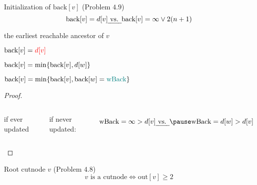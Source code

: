 \begin{frame}{}
  \begin{exampleblock}{Initialization of $\text{back}[v]$ (Problem $4.9$)}
    \[
      \text{back}[v] = d[v] \text{\emph{ vs. }} \text{back}[v] = \infty \lor 2(n+1) 
    \]
  \end{exampleblock}

  \pause
  \vspace{0.50cm}
  \centerline{ the earliest reachable ancestor of $v$} %

  \pause
  \vspace{0.30cm}
  \begin{description}
    \item[tree edge ($\to v$):]   $\text{back}[v] = \textcolor{red}{d[v]}$
    \item[back edge ($v \to w$):] $\text{back}[v] = \min \{\text{back}[v], d[w]\}$
    \item[backtracking from $w$:] $\text{back}[v] = \min \{\text{back}[v], \text{back}[w] = \textcolor{teal}{\text{wBack}}\}$
  \end{description}

  \pause
  \begin{proof}
    \begin{columns}
	\centerline{if ever updated}
	\pause
	\centerline{if never updated:}
	\pause
	\[
	  \text{wBack} = \infty > d[v] \text{\emph{ vs. }} \pause \text{wBack} = d[w] > d[v]
	\]
    \end{columns}
    \vspace{-0.50cm}
  \end{proof}
\end{frame}
\begin{frame}{}
  \begin{exampleblock}{Root cutnode $v$ (Problem $4.8$)}
    \[
      v \text{ is a cutnode} \iff \text{out}[v] \ge 2
    \]
  \end{exampleblock}

  \pause
\end{frame}
% 
% 
